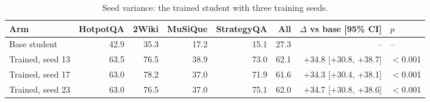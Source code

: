 \begin{table}[t]
\centering
\small
\caption{Seed variance: the trained student with three training seeds.}
\label{tab:E02-seeds}
\begin{tabular}{lrrrrrrl}
\toprule
Arm & HotpotQA & 2Wiki & MuSiQue & StrategyQA & All & $\Delta$ vs base [95\% CI] & $p$ \\
\midrule
Base student & 42.9 & 35.3 & 17.2 & 15.1 & 27.3 & -- & -- \\
Trained, seed 13 & 63.5 & 76.5 & 38.9 & 73.0 & 62.1 & +34.8 [+30.8, +38.7] & $<$0.001 \\
Trained, seed 17 & 63.0 & 78.2 & 37.0 & 71.9 & 61.6 & +34.3 [+30.4, +38.1] & $<$0.001 \\
Trained, seed 23 & 63.0 & 76.5 & 37.0 & 75.1 & 62.0 & +34.7 [+30.8, +38.6] & $<$0.001 \\
\bottomrule
\end{tabular}
\end{table}
